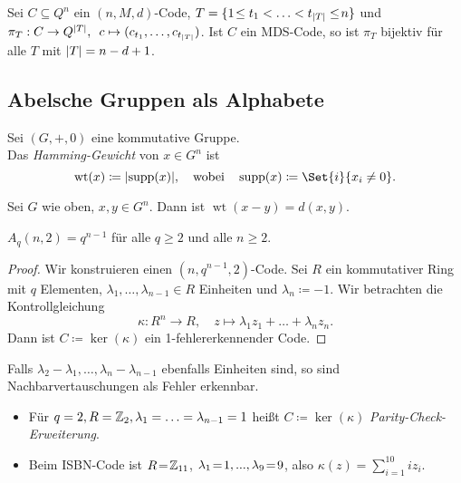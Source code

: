 \documentclass{cheat-sheet}
\DeclareMathOperator{\wt}{wt} %
\begin{document}
\begin{samepage}

\begin{bem}
  Sei $C \subseteq Q^n$ ein $(n, M, d)$-Code,
  $T = \{ 1 \!\leq t_1 < \ldots < t_{\lvert T\rvert} \leq\! n \}$ und
  $\pi_T : C \to Q^{\lvert T\rvert}, \enspace c \mapsto (c_{t_1}, \ldots, c_{t_{\lvert T\rvert}})$.
  Ist $C$ ein MDS-Code, so ist $\pi_T$ bijektiv für alle $T$ mit $\lvert T\rvert = n - d + 1$.
\end{bem}

\subsection{Abelsche Gruppen als Alphabete}

\end{samepage}

\begin{defn}
  Sei $(G, +, 0)$ eine kommutative Gruppe. \\
  Das \emph{Hamming-Gewicht} von $x \in G^n$ ist
  \[
    \wt(x) \coloneqq \abs{\supp(x)},
    \quad \text{wobei} \quad
    \supp(x) \coloneqq \Set{i}{x_i \neq 0}.
  \]
\end{defn}

\begin{lem}
  Sei $G$ wie oben, $x, y \in G^n$.
  Dann ist $\wt(x-y) = d(x, y)$.
\end{lem}

\begin{satz}
  $A_q(n, 2) = q^{n-1}$ für alle $q \geq 2$ und alle $n \geq 2$.
\end{satz}

\begin{proof}
  Wir konstruieren einen $(n, q^{n-1}, 2)$-Code.
  Sei $R$ ein kommutativer Ring mit $q$ Elementen, $\lambda_1, \ldots, \lambda_{n-1} \in R$ Einheiten und $\lambda_n \coloneqq -1$. Wir betrachten die Kontrollgleichung
  \[
    \kappa : R^n \to R, \quad
    z \mapsto \lambda_1 z_1 + \ldots + \lambda_n z_n.
  \]
  Dann ist $C \coloneqq \ker(\kappa)$ ein 1-fehlererkennender Code.
\end{proof}

\begin{lem}
  Falls $\lambda_2 - \lambda_1, \ldots, \lambda_n - \lambda_{n-1}$ ebenfalls Einheiten sind, so sind Nachbarvertauschungen als Fehler erkennbar.
\end{lem}

\begin{bspe}
  \begin{itemize}
    \item Für $q=2, R=\mathbb{Z}_2, \lambda_1 = \ldots = \lambda_{n-1} = 1$ heißt $C \coloneqq \ker(\kappa)$ \emph{Parity-Check-Erweiterung}.
    \item Beim ISBN-Code ist $R \!=\! \mathbb{Z}_{11}$, $\lambda_1 \!=\! 1, ..., \lambda_9 \!=\! 9$, also $\kappa(z) = \sum_{i=1}^{10} i z_i$.
  \end{itemize}
\end{bspe}
\end{document}
